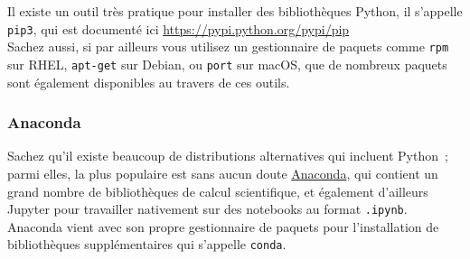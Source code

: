     Il existe un outil très pratique pour installer des bibliothèques
Python, il s'appelle \texttt{pip3}, qui est documenté ici
\href{https://pypi.python.org/pypi/pip}{https://pypi.python.org/pypi/pip}\\

    Sachez aussi, si par ailleurs vous utilisez un gestionnaire de paquets
comme \texttt{rpm} sur RHEL, \texttt{apt-get} sur Debian, ou
\texttt{port} sur macOS, que de nombreux paquets sont également
disponibles au travers de ces outils.

    \hypertarget{anaconda}{%
\subsubsection{Anaconda}\label{anaconda}}

    Sachez qu'il existe beaucoup de distributions alternatives qui incluent
Python~; parmi elles, la plus populaire est sans aucun doute
\href{https://www.anaconda.com/}{Anaconda}, qui contient un grand nombre
de bibliothèques de calcul scientifique, et également d'ailleurs Jupyter
pour travailler nativement sur des notebooks au format \texttt{.ipynb}.\\

Anaconda vient avec son propre gestionnaire de paquets pour
l'installation de bibliothèques supplémentaires qui s'appelle
\texttt{conda}.